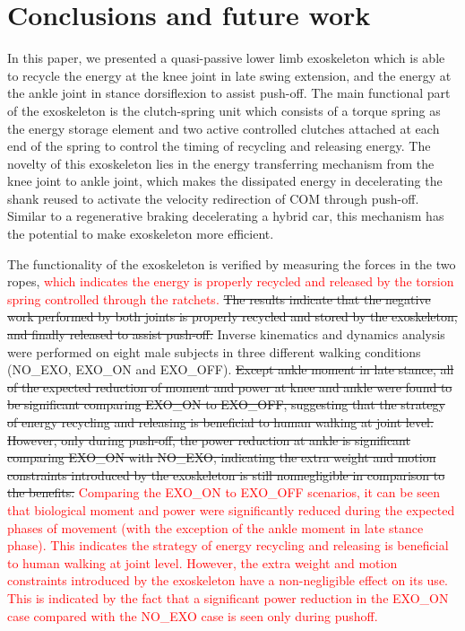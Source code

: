 \documentclass[twocolumn,cleanfoot,10pt]{asme2ej}
\begin{document}
\section{Conclusions and future work}
\label{sec:discussion}
In this paper, we presented a quasi-passive lower limb exoskeleton which is able to recycle the energy at the knee joint in late swing extension, and the energy at the ankle joint in stance dorsiflexion to assist push-off.
The main functional part of the exoskeleton is the clutch-spring unit which consists of a torque spring as the energy storage element and two active controlled clutches attached at each end of the spring to control the timing of recycling and releasing energy.
The novelty of this exoskeleton lies in the energy transferring mechanism from the knee joint to ankle joint, which makes the dissipated energy in decelerating the shank reused to activate the velocity redirection of COM through push-off.
Similar to a regenerative braking decelerating a hybrid car, this mechanism has the potential to make exoskeleton more efficient.

The functionality of the exoskeleton is verified by measuring the forces in the two ropes, \textcolor{red}{which indicates the energy is properly recycled and released by the torsion spring controlled through the ratchets.}
\sout{The results indicate that the negative work performed by both joints is properly recycled and stored by the exoskeleton, and finally released to assist push-off.}
Inverse kinematics and dynamics analysis were performed on eight male subjects in three different walking conditions (NO\_EXO, EXO\_ON and EXO\_OFF).
\sout{Except ankle moment in late stance, all of the expected reduction of moment and power at knee and ankle were found to be significant comparing EXO\_ON to EXO\_OFF, suggesting that the strategy of energy recycling and releasing is beneficial to human walking at joint level. However, only during push-off, the power reduction at ankle is significant comparing EXO\_ON with NO\_EXO, indicating the extra weight and motion constraints introduced by the exoskeleton is still nonnegligible in comparison to the benefits.}
\textcolor{red}{Comparing the EXO\_ON to EXO\_OFF scenarios, it can be seen that biological moment and power were significantly reduced during the expected phases of movement (with the exception of the ankle moment in late stance phase).
This indicates the strategy of energy recycling and releasing is beneficial to human walking at joint level.
However, the extra weight and motion constraints introduced by the exoskeleton have a non-negligible effect on its use.
This is indicated by the fact that a significant power reduction in the EXO\_ON case compared with the NO\_EXO case is seen only during pushoff.}
\end{document}
